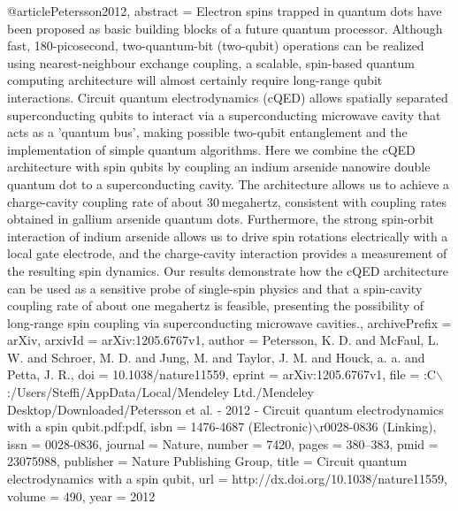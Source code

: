 @article{Petersson2012,
abstract = {Electron spins trapped in quantum dots have been proposed as basic building blocks of a future quantum processor. Although fast, 180-picosecond, two-quantum-bit (two-qubit) operations can be realized using nearest-neighbour exchange coupling, a scalable, spin-based quantum computing architecture will almost certainly require long-range qubit interactions. Circuit quantum electrodynamics (cQED) allows spatially separated superconducting qubits to interact via a superconducting microwave cavity that acts as a 'quantum bus', making possible two-qubit entanglement and the implementation of simple quantum algorithms. Here we combine the cQED architecture with spin qubits by coupling an indium arsenide nanowire double quantum dot to a superconducting cavity. The architecture allows us to achieve a charge-cavity coupling rate of about 30 megahertz, consistent with coupling rates obtained in gallium arsenide quantum dots. Furthermore, the strong spin-orbit interaction of indium arsenide allows us to drive spin rotations electrically with a local gate electrode, and the charge-cavity interaction provides a measurement of the resulting spin dynamics. Our results demonstrate how the cQED architecture can be used as a sensitive probe of single-spin physics and that a spin-cavity coupling rate of about one megahertz is feasible, presenting the possibility of long-range spin coupling via superconducting microwave cavities.},
archivePrefix = {arXiv},
arxivId = {arXiv:1205.6767v1},
author = {Petersson, K. D. and McFaul, L. W. and Schroer, M. D. and Jung, M. and Taylor, J. M. and Houck, a. a. and Petta, J. R.},
doi = {10.1038/nature11559},
eprint = {arXiv:1205.6767v1},
file = {:C$\backslash$:/Users/Steffi/AppData/Local/Mendeley Ltd./Mendeley Desktop/Downloaded/Petersson et al. - 2012 - Circuit quantum electrodynamics with a spin qubit.pdf:pdf},
isbn = {1476-4687 (Electronic)$\backslash$r0028-0836 (Linking)},
issn = {0028-0836},
journal = {Nature},
number = {7420},
pages = {380--383},
pmid = {23075988},
publisher = {Nature Publishing Group},
title = {{Circuit quantum electrodynamics with a spin qubit}},
url = {http://dx.doi.org/10.1038/nature11559},
volume = {490},
year = {2012}
}
